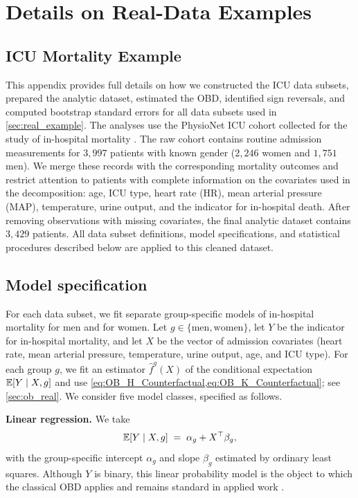 \section{Details on Real-Data Examples}
\subsection{ICU Mortality Example}
\label{appendix:icu_details}

This appendix provides full details on how we constructed the ICU data subsets, prepared the analytic dataset, estimated the OBD, identified sign reversals, and computed bootstrap standard errors for all data subsets used in \cref{sec:real_example}. The analyses use the PhysioNet ICU cohort collected for the study of in-hospital mortality \citep{goldberger2000physiobank}. The raw cohort contains routine admission measurements for $3,997$ patients with known gender ($2,246$ women and $1,751$ men). We merge these records with the corresponding mortality outcomes and restrict attention to patients with complete information on the covariates used in the decomposition: age, ICU type, heart rate (HR), mean arterial pressure (MAP), temperature, urine output, and the indicator for in-hospital death. After removing observations with missing covariates, the final analytic dataset contains $3,429$ patients. All data subset definitions, model specifications, and statistical procedures described below are applied to this cleaned dataset.

\subsection*{Model specification}

For each data subset, we fit separate group-specific models of in-hospital mortality for men and for women. Let $g \in \{\text{men}, \text{women}\}$, let $Y$ be the indicator for in-hospital mortality, and let $X$ be the vector of admission covariates (heart rate, mean arterial pressure, temperature, urine output, age, and ICU type). For each group $g$, we fit an estimator $\hat{f}^g(X)$ of the conditional expectation $\mathbb{E}[Y \mid X, g]$ and use \cref{eq:OB_H_Counterfactual,eq:OB_K_Counterfactual}; see \cref{sec:ob_real}. We consider five model classes, specified as follows.

\textbf{Linear regression.} We take
\[
    \mathbb{E}[Y \mid X, g] \;=\; \alpha_{g} + X^{\top}\beta_{g},
\]
with the group-specific intercept $\alpha_{g}$ and slope $\beta_{g}$ estimated by ordinary least squares. Although $Y$ is binary, this linear probability model is the object to which the classical OBD applies and remains standard in applied work \citep{jann2008, edokaChangesCatastrophicHealth2017, sujin_LPM_OB, mweembaGapSelfRatedHealth2023}.

